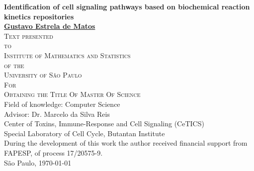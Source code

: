 \documentclass[12pt, twoside]{report}
\numberwithin{mydefinition}{section}
\numberwithin{mytheorem}{section}
\numberwithin{mylemma}{section}
\numberwithin{corollary}{section}
\begin{document}

\thispagestyle{empty}
\begin{center}
{\Large
{\bf Identification of cell signaling pathways based on biochemical 
    reaction kinetics repositories}\\
\bigskip
\bigskip
\bigskip
\bigskip
    {\bf \href{mailto:gustavo.estrela.matos@gmail.com}{Gustavo Estrela de Matos}}\\
\bigskip
\bigskip
\bigskip
\bigskip
\textsc{
    Text presented\\[-0.25cm] 
    to\\[-0.25cm]
    Institute of Mathematics and Statistics\\[-0.25cm]
    of the\\[-0.25cm]
    University of São Paulo\\[-0.25cm]
    For\\[-0.25cm]
    Obtaining the Title Of Master Of Science\\
    }
\bigskip
\bigskip
\bigskip
\bigskip
Field of knowledge: Computer Science\\
\bigskip
Advisor: Dr. Marcelo da Silva Reis\\
\bigskip
\bigskip
\bigskip
\bigskip
\bigskip
\bigskip
\bigskip
\bigskip
Center of Toxins, Immune-Response and Cell Signaling (CeTICS)\\
\bigskip
Special Laboratory of Cell Cycle, Butantan Institute\\
\bigskip
\bigskip
{\normalsize During the development of this work the author received 
    financial support from FAPESP, of process 17/20575-9.}\\
\bigskip
\bigskip
\bigskip
São Paulo, \today
}
\end{center}
\newpage
\end{document}
